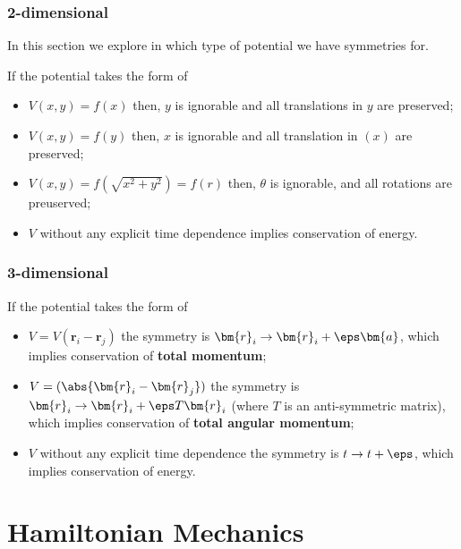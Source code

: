 \documentclass[12pt, a4paper]{article}
\begin{document}
\subsubsection{2-dimensional}

In this section we explore in which type of potential we have symmetries for.

\begin{mdthm}
    If the potential takes the form of 
    \begin{itemize}
        \item \(V(x,y)=f(x)\) then, \(y\) is ignorable and all translations in \(y\) are preserved;
        \item \(V(x,y)=f(y)\) then, \(x\) is ignorable and all translation in \((x)\) are preserved;
        \item \(V(x,y) = f(\sqrt{x^2+y^2})=f(r)\) then, \(\theta\) is ignorable, and all rotations are preuserved;
        \item \(V\) without any explicit time dependence implies conservation of energy.
    \end{itemize}
\end{mdthm}

\subsubsection{3-dimensional}

\begin{mdthm}
    If the potential takes the form of 
    \begin{itemize}
        \item \(V=V(\bm{r}_i-\bm{r}_j)\) the symmetry is \(\bm{r}_i \to \bm{r}_i + \eps \bm{a}\), which implies conservation of \textbf{total momentum};
        \item \(V=(\abs{\bm{r}_i-\bm{r}_j})\) the symmetry is \(\bm{r}_i \to \bm{r}_i +\eps T \bm{r}_i\) (where \(T\) is an anti-symmetric matrix), which implies conservation of \textbf{total angular momentum};
        \item \(V\) without any explicit time dependence the symmetry is \(t \to t+\eps\), which implies conservation of energy.
    \end{itemize}
\end{mdthm}


\section{Hamiltonian Mechanics}
\end{document}
